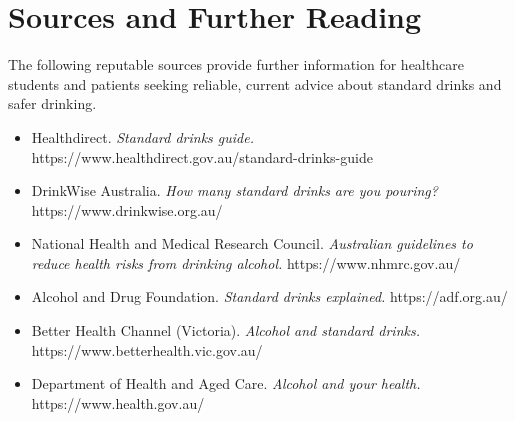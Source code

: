 \section*{Sources and Further Reading}
The following reputable sources provide further information for healthcare students and patients seeking reliable, current advice about standard drinks and safer drinking.
\begin{itemize}
    \item Healthdirect. \textit{Standard drinks guide.} https://www.healthdirect.gov.au/standard-drinks-guide
    \item DrinkWise Australia. \textit{How many standard drinks are you pouring?} https://www.drinkwise.org.au/
    \item National Health and Medical Research Council. \textit{Australian guidelines to reduce health risks from drinking alcohol.} https://www.nhmrc.gov.au/
    \item Alcohol and Drug Foundation. \textit{Standard drinks explained.} https://adf.org.au/
    \item Better Health Channel (Victoria). \textit{Alcohol and standard drinks.} https://www.betterhealth.vic.gov.au/
    \item Department of Health and Aged Care. \textit{Alcohol and your health.} https://www.health.gov.au/
\end{itemize}
